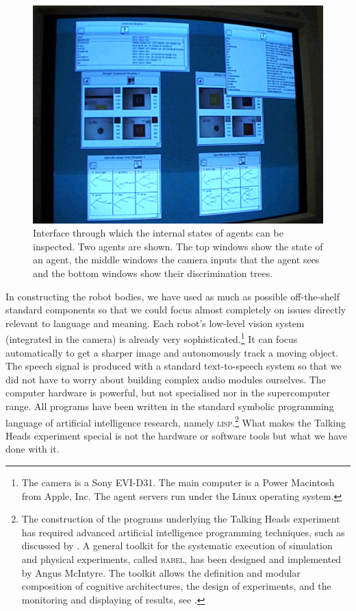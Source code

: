\begin{figure}[htbp]
  \centerline{\includegraphics[width=.75\textwidth]{chap1/figs/Interface.pdf}}
\caption{Interface through which the internal states of agents can 
be inspected. Two agents are shown. The top windows show the state of an agent, 
the middle windows the camera inputs that the agent sees and the bottom windows show 
their discrimination trees.}
\label{f:agentview}
\end{figure}

In constructing the robot bodies, we have used as much as
possible off-the-shelf standard 
components so that we could focus almost completely on issues
directly relevant to language and meaning.
Each robot's low-level vision system
(integrated in the camera) is already very sophisticated.\footnote{
The camera is a Sony EVI-D31. The main computer is a Power 
Macintosh from Apple, Inc. The agent servers run under the 
Linux operating system.}
It can focus automatically to get a sharper image
and autonomously track a moving object. The speech signal is 
produced with a standard text-to-speech system 
so that we did not have to 
worry about building complex audio modules ourselves.
The computer hardware 
is powerful, but not specialised nor in the supercomputer 
range. All programs have been written in the standard symbolic 
programming language of artificial intelligence 
research, namely \textsc{lisp}.\footnote{
The construction of the programs underlying the 
Talking Heads experiment has required advanced
artificial intelligence programming techniques, 
such as discussed by \cite{Norvig:1996}. A general
toolkit for the systematic execution of 
simulation and physical experiments, called \textsc{babel}, has been
designed and implemented by Angus McIntyre. The 
toolkit allows the definition and modular composition
of cognitive architectures, the design of 
experiments, and the monitoring and displaying of 
results, see \cite{McIntyre:1998}.} What makes the Talking Heads experiment
special is not the hardware or software tools
but what we have done with it.


